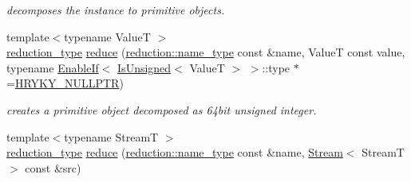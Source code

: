 \begin{DoxyCompactItemize}
\begin{DoxyCompactList}\small\item\em decomposes the instance to primitive objects. \end{DoxyCompactList}\item 
{\footnotesize template$<$typename Value\-T $>$ }\\\hyperlink{namespacehryky_a343a9a4c36a586be5c2693156200eadc}{reduction\-\_\-type} \hyperlink{namespacehryky_1_1reduction_a1caab12addb28a07707b69d6f19e26fd}{reduce} (\hyperlink{namespacehryky_1_1reduction_ac686c30a4c8d196bbd0f05629a6b921f}{reduction\-::name\-\_\-type} const \&name, Value\-T const value, typename \hyperlink{classhryky_1_1_enable_if}{Enable\-If}$<$ \hyperlink{classhryky_1_1_is_unsigned}{Is\-Unsigned}$<$ Value\-T $>$ $>$\-::type $\ast$=\hyperlink{common_8h_a4cd4ac09cfcdbd6b30ee69afc156e210}{H\-R\-Y\-K\-Y\-\_\-\-N\-U\-L\-L\-P\-T\-R})
\begin{DoxyCompactList}\small\item\em creates a primitive object decomposed as 64bit unsigned integer. \end{DoxyCompactList}\item 
\hypertarget{namespacehryky_1_1reduction_ad257dda0d3de13b9f3fd08351883d3a4}{{\footnotesize template$<$typename Stream\-T $>$ }\\\hyperlink{namespacehryky_a343a9a4c36a586be5c2693156200eadc}{reduction\-\_\-type} \hyperlink{namespacehryky_1_1reduction_ad257dda0d3de13b9f3fd08351883d3a4}{reduce} (\hyperlink{namespacehryky_1_1reduction_ac686c30a4c8d196bbd0f05629a6b921f}{reduction\-::name\-\_\-type} const \&name, \hyperlink{classhryky_1_1reduction_1_1_stream}{Stream}$<$ Stream\-T $>$ const \&src)}\label{namespacehryky_1_1reduction_ad257dda0d3de13b9f3fd08351883d3a4}


\end{DoxyCompactItemize}
